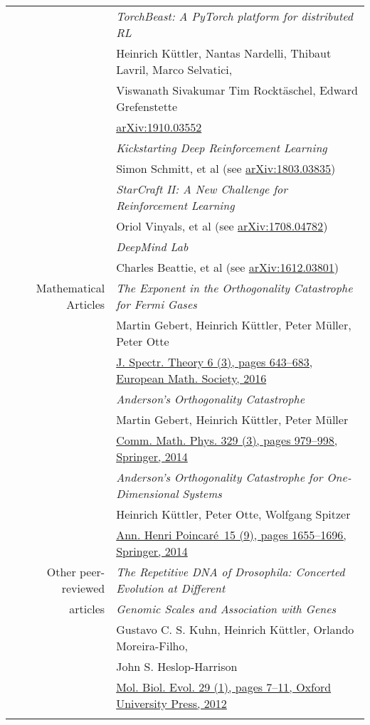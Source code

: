 \documentclass[11pt,english,a4paper]{memoir}
\newcommand{\n}{\tabularnewline}
\begin{document}
\begin{center}
\begin{tabular}{rl}
  & \textit{TorchBeast: A PyTorch platform for distributed RL} \\
  & Heinrich K{\"u}ttler, Nantas Nardelli, Thibaut Lavril, Marco
  Selvatici, \\
  & Viswanath Sivakumar Tim Rockt{\"a}schel, Edward Grefenstette \\
  & \href{https://arxiv.org/abs/1910.03552}{arXiv:1910.03552} \n \addlinespace

  & \textit{Kickstarting Deep Reinforcement Learning} \\
  & Simon Schmitt, et al (see \href{https://arxiv.org/abs/1803.03835}{arXiv:1803.03835})
  \n \addlinespace

  & \textit{StarCraft II: A New Challenge for Reinforcement Learning} \\
  & Oriol Vinyals, et al (see \href{https://arxiv.org/abs/1708.04782}{arXiv:1708.04782}) \n \addlinespace

  & \textit{DeepMind Lab} \\
  & Charles Beattie, et al (see \href{https://arxiv.org/abs/1612.03801}{arXiv:1612.03801}) \n \addlinespace

  Mathematical Articles
  & \textit{The Exponent in the Orthogonality Catastrophe for Fermi Gases} \\
  & Martin Gebert, Heinrich Küttler, Peter Müller, Peter Otte \\
  & \href{http://dx.doi.org/10.4171/JST/135}{J. Spectr. Theory 6 (3), pages 643--683, European Math. Society, 2016} \n \addlinespace

  & \textit{Anderson's Orthogonality Catastrophe} \\
  & Martin Gebert, Heinrich Küttler, Peter Müller \\
  & \href{http://dx.doi.org/10.1007/s00220-014-1914-3}{Comm. Math. Phys. 329 (3), pages 979--998,
  Springer, 2014} \n \addlinespace

  & \textit{Anderson's Orthogonality Catastrophe for One-Dimensional Systems}
  \\
  & Heinrich Küttler, Peter Otte, Wolfgang Spitzer \\
  & \href{http://dx.doi.org/10.1007/s00023-013-0287-z}{Ann. Henri Poincaré \,15 (9), pages 1655--1696, Springer, 2014}

  \n \addlinespace
  Other peer-reviewed & \textit{The Repetitive DNA of Drosophila:
  Concerted Evolution at Different}
  \\
  articles & \textit{Genomic Scales and Association with Genes} \\
  & Gustavo C. S. Kuhn, Heinrich Küttler, Orlando Moreira-Filho, \\
  & John S. Heslop-Harrison \\
  & \href{http://dx.doi.org/10.1093/molbev/msr173}{Mol. Biol. Evol. 29 (1), pages 7--11, Oxford University Press, 2012}
  \n \addlinespace


\end{tabular}
\end{center}
\end{document}
